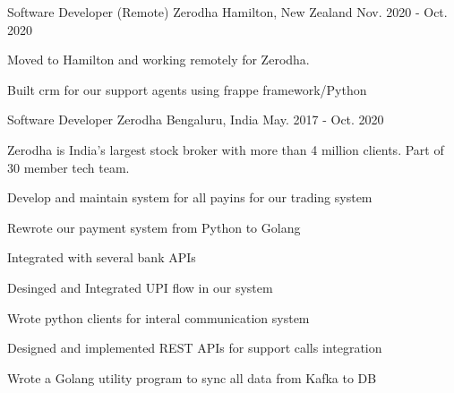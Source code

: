 

\begin{cvexperiences}

    \cvexperience
    {Software Developer (Remote)} %
    {Zerodha} %
    {Hamilton, New Zealand} %
    {Nov. 2020 - Oct. 2020} %
    {\begin{cvparagraph} %
      Moved to Hamilton and working remotely for Zerodha.
\end{cvparagraph}
}    
   { \begin{cvitems} %
      \item {Built crm for our support agents using frappe framework/Python}
    \end{cvitems}
}



  \cvexperience
    {Software Developer} %
    {Zerodha} %
    {Bengaluru, India} %
    {May. 2017 - Oct. 2020} %
    {\begin{cvparagraph} %
      Zerodha is India's largest stock broker with more than 4 million clients. Part of 30 member tech team.
\end{cvparagraph}
}    {
      \begin{cvitems} %
        \item {Develop and maintain system for all payins for our trading system}
        \item {Rewrote our payment system from Python to Golang}
        \item{Integrated with several bank APIs}
        \item{Desinged and Integrated UPI flow in our system}
        \item{Wrote python clients for interal communication system}
        \item{Designed and implemented REST APIs for support calls integration}
        \item {Wrote a Golang utility program to sync all data from Kafka to DB}
      \end{cvitems}
    }


\end{cvexperiences}
